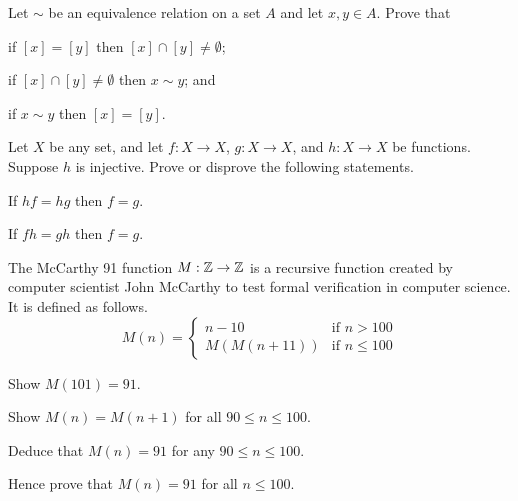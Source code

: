 \begin{problem}\label{problem-equivalence-class-equivalence}
    Let $\sim$ be an equivalence relation on a set $A$ and let $x, y \in A$. Prove that
    \begin{partquestions}{\alph*}
        \item if $[x] = [y]$ then $[x] \cap [y] \neq \emptyset$;
        \item if $[x] \cap [y] \neq \emptyset$ then $x \mathrel{\sim} y$; and
        \item if $x \mathrel{\sim} y$ then $[x] = [y]$.
    \end{partquestions}
\end{problem}

\begin{problem}
    Let $X$ be any set, and let $f: X \to X$, $g: X \to X$, and $h: X \to X$ be functions. Suppose $h$ is injective. Prove or disprove the following statements.
    \begin{partquestions}{\alph*}
        \item If $hf = hg$ then $f = g$.
        \item If $fh = gh$ then $f = g$.
    \end{partquestions}
\end{problem}

\newpage

\begin{problem}
    The McCarthy 91 function $M: \mathbb{Z} \to \mathbb{Z}$ is a recursive function created by computer scientist John McCarthy to test formal verification in computer science. It is defined as follows.
    \[
        M(n) = \begin{cases}
            n - 10 & \text{if } n > 100\\
            M(M(n+11)) & \text{if } n \leq 100
        \end{cases}
    \]
    \begin{partquestions}{\roman*}
        \item Show $M(101) = 91$.
        \item Show $M(n) = M(n+1)$ for all $90 \leq n \leq 100$.
        \item Deduce that $M(n) = 91$ for any $90 \leq n \leq 100$.
        \item Hence prove that $M(n) = 91$ for all $n \leq 100$.
    \end{partquestions}
\end{problem}

